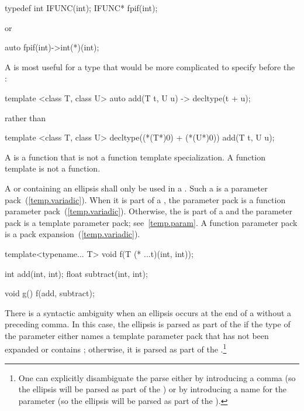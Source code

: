 \begin{codeblock}
typedef int  IFUNC(int);
IFUNC*  fpif(int);
\end{codeblock}

or

\begin{codeblock}
auto fpif(int)->int(*)(int);
\end{codeblock}

A  is most useful for a type that would be more complicated to specify before the :

\begin{codeblock}
template <class T, class U> auto add(T t, U u) -> decltype(t + u);
\end{codeblock}

rather than

\begin{codeblock}
template <class T, class U> decltype((*(T*)0) + (*(U*)0)) add(T t, U u);
\end{codeblock}
\exitnote

\pnum
A  is a function that is not a function template
specialization. \enternote A function template is not a function. \exitnote

\pnum
A  or 
containing an ellipsis shall only
be used in a . Such a
 is a parameter
pack~(\ref{temp.variadic}). When it is part of a
, the parameter pack is a
function parameter pack~(\ref{temp.variadic}). \enternote
Otherwise, the  is part of a
 and the parameter pack is a
template parameter pack; see~\ref{temp.param}. \exitnote
A function parameter pack is a pack expansion~(\ref{temp.variadic}).
\enterexample

\begin{codeblock}
template<typename... T> void f(T (* ...t)(int, int));

int add(int, int);
float subtract(int, int);

void g() {
  f(add, subtract);
}
\end{codeblock}
\exitexample

\pnum
There is a syntactic ambiguity when an ellipsis occurs at the end
of a  without a preceding
comma. In this case, the ellipsis is parsed as part of the
 if the type of the parameter either names
a template parameter pack that has not been expanded or contains ;
otherwise, it is
parsed as part of the .\footnote{One can explicitly disambiguate the parse either by
introducing a comma (so the ellipsis will be parsed as part of the
) or by introducing a name for the
parameter (so the ellipsis will be parsed as part of the
).}%

